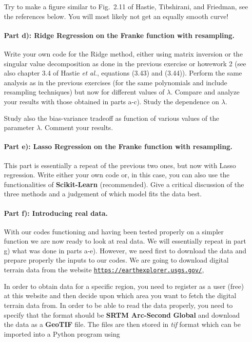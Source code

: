 \documentclass[%
oneside,                 %
final,                   %
10pt]{article}
\begin{document}
Try to make a figure similar to Fig.~2.11 of Hastie, Tibshirani, and
Friedman, see the references below. You will most likely not get an
equally smooth curve!

\paragraph{Part d): Ridge Regression on the Franke function  with resampling.}
Write your own code for the Ridge method, either using matrix
inversion or the singular value decomposition as done in the previous
exercise or howework 2 (see also chapter 3.4 of Hastie \emph{et al.},
equations (3.43) and (3.44)). Perform the same analysis as in the
previous exercises (for the same polynomials and include resampling
techniques) but now for different values of $\lambda$. Compare and
analyze your results with those obtained in parts a-c). Study the
dependence on $\lambda$.

Study also the bias-variance tradeoff as function of various values of
the parameter $\lambda$. Comment your results. 

\paragraph{Part e): Lasso Regression on the Franke function  with resampling.}
This part is essentially a repeat of the previous two ones, but now
with Lasso regression. Write either your own code or, in this case,
you can also use the functionalities of \textbf{Scikit-Learn} (recommended). 
Give a
critical discussion of the three methods and a judgement of which
model fits the data best.

\paragraph{Part f): Introducing real data.}
With our codes functioning and having been tested properly on a
simpler function we are now ready to look at real data. We will
essentially repeat in part g) what was done in parts a-e). However, we
need first to download the data and prepare properly the inputs to our
codes.  We are going to download digital terrain data from the website
\href{{https://earthexplorer.usgs.gov/}}{\nolinkurl{https://earthexplorer.usgs.gov/}},

In order to obtain data for a specific region, you need to register as
a user (free) at this website and then decide upon which area you want
to fetch the digital terrain data from.  In order to be able to read
the data properly, you need to specify that the format should be \textbf{SRTM
Arc-Second Global} and download the data as a \textbf{GeoTIF} file.  The
files are then stored in \emph{tif} format which can be imported into a
Python program using
\end{document}

